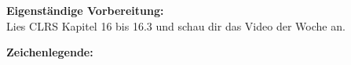 \documentclass{uebung_cs}
\begin{document}
\textbf{Eigenständige Vorbereitung:}\\
Lies  CLRS Kapitel 16 bis 16.3 und schau dir das  Video der Woche an.

\textbf{Zeichenlegende:}
\legende{}


\begin{aufgabe}[test]
\end{aufgabe}

\begin{aufgabe}[test]
\end{aufgabe}
\end{document}
